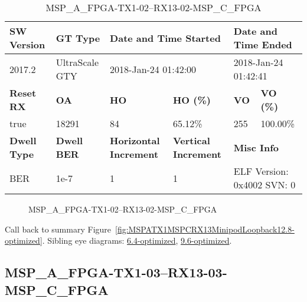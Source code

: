 \begin{table}[h]
\centering
\caption{MSP\_A\_FPGA-TX1-02--RX13-02-MSP\_C\_FPGA}
\label{tab:MSPAFPGATX102RX1302MSPCFPGA12.8-optimized}
\begin{tabular}{@{}|l|l|l|l|l|l|@{}}
\toprule
\textbf{SW Version}                & \textbf{GT Type}   & \multicolumn{2}{l|}{\textbf{Date and Time Started}}            & \multicolumn{2}{l|}{\textbf{Date and Time Ended}}        \\ \midrule
2017.2                       & UltraScale GTY          & \multicolumn{2}{l|}{2018-Jan-24 01:42:00}                   & \multicolumn{2}{l|}{2018-Jan-24 01:42:41}               \\ \midrule
\textbf{Reset RX}                  & \textbf{OA} & \textbf{HO}   & \textbf{HO (\%)} & \textbf{VO} & \textbf{VO (\%)} \\ \midrule
true & 18291        & 84          & 65.12\%        & 255        & 100.00\%       \\ \midrule
\textbf{Dwell Type}                & \textbf{Dwell BER} & \textbf{Horizontal Increment} & \textbf{Vertical Increment}    & \multicolumn{2}{l|}{\textbf{Misc Info}}                  \\ \midrule
BER                            & 1e-7        & 1        & 1           & \multicolumn{2}{l|}{ELF Version: 0x4002 SVN: 0}                         \\ \bottomrule
\end{tabular}
\end{table}

\begin{figure}[h]
\caption{MSP\_A\_FPGA-TX1-02--RX13-02-MSP\_C\_FPGA} \label{fig:MSPAFPGATX102RX1302MSPCFPGA12.8-optimized}
\end{figure}

Call back to summary Figure~\ref{fig:MSPATX1MSPCRX13MinipodLoopback12.8-optimized}.
Sibling eye diagrams: \hyperref[sec:MSPAFPGATX102RX1302MSPCFPGA6.4-optimized]{6.4-optimized}, \hyperref[sec:MSPAFPGATX102RX1302MSPCFPGA9.6-optimized]{9.6-optimized}.

\clearpage
\newpage


\subsection{MSP\_A\_FPGA-TX1-03--RX13-03-MSP\_C\_FPGA}\label{sec:MSPAFPGATX103RX1303MSPCFPGA12.8-optimized}

